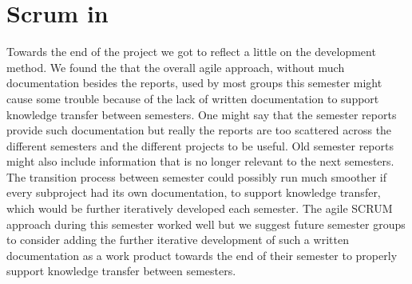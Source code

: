 
\section{Scrum in \giraf}

Towards the end of the project we got to reflect a little on the \giraf development method. We found the that the overall agile approach, without much documentation besides the reports, used by most groups this semester might cause some trouble because of the lack of written documentation to support knowledge transfer between semesters. One might say that the semester reports provide such documentation but really the reports are too scattered across the different semesters and the different projects to be useful. Old semester reports might also include information that is no longer relevant to the next semesters. The transition process between semester could possibly run much smoother if every subproject had its own documentation, to support knowledge transfer, which would be further iteratively developed each semester. The agile SCRUM approach during this semester worked well but we suggest future semester groups to consider adding the further iterative development of such a written documentation as a work product towards the end of their semester to properly support knowledge transfer between semesters.     
